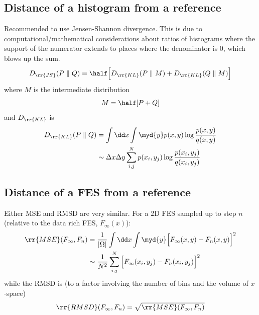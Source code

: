 \subsection{Distance of a histogram from a reference}
Recommended to use Jensen-Shannon divergence.  This is due to computational/mathematical considerations about ratios of histograms where the support of the numerator extends to places where the denominator is 0, which blows up the sum.
\[
    D_\rr{JS}(P\parallel Q) = \half\Big[ D_\rr{KL}(P\parallel M) + D_\rr{KL}(Q\parallel M)\Big]
\]
where $M$ is the intermediate distribution
\[
    M = \half [P + Q]
\]
and $D_\rr{KL}$ is
\begin{align*}
    D_\rr{KL}(P\parallel Q) &= \int\dd x\int\myd{y}p(x,y)\log\frac{p(x,y)}{q(x,y)} \\
    &\sim \Delta x\Delta y\sum_{i,j}^N p(x_i,y_j)\log\frac{p(x_i,y_j)}{q(x_i,y_j)}
\end{align*}

\subsection{Distance of a FES from a reference}
Either MSE and RMSD are very similar.  For a 2D FES sampled up to step $n$ (relative to the data rich FES, $F_\infty(x)$):
\begin{align*}
    \rr{MSE}(F_\infty, F_n) &= \frac{1}{|\Omega|}\int\dd x\int\myd{y}
    \Big[F_\infty(x,y) - F_n(x,y) \Big]^2 \\
    &\sim \frac{1}{N^2} \sum_{i,j}^N
    \Big[F_\infty(x_i,y_j) - F_n(x_i,y_j) \Big]^2
\end{align*}
while the RMSD is (to a factor involving the number of bins and the volume of $x$-space)
\[
    \rr{RMSD}(F_\infty, F_n) = \sqrt{\rr{MSE}(F_\infty, F_n)}
\]
